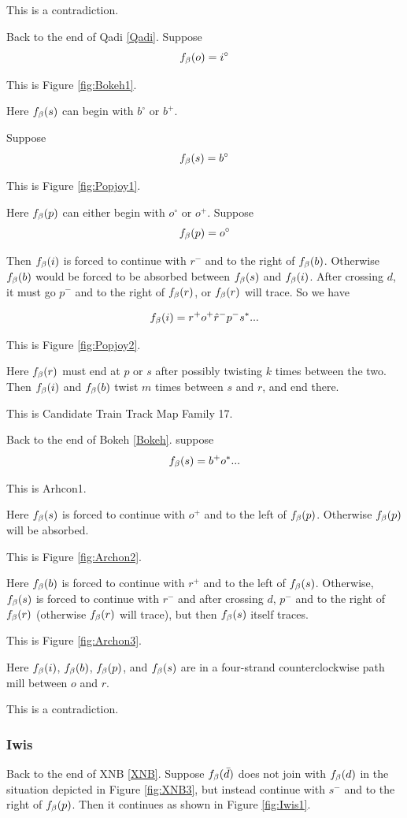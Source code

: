 This is a contradiction.


\label{Bokeh}
Back to the end of Qadi \ref{Qadi}. Suppose 
\[
f_\beta(o) = i^\circ
\]

This is Figure \ref{fig:Bokeh1}.

Here $f_\beta(s)$ can begin with $b^\circ$ or $b^+$.

\label{Popjoy}
Suppose 
\[
f_\beta(s) = b^\circ
\]

This is Figure \ref{fig:Popjoy1}.

Here $f_\beta(p)$ can either begin with $o^\circ$ or $o^+$. Suppose
\[
f_\beta(p) = o^\circ
\]

Then $f_\beta(i)$ is forced to continue with $r^-$ and to the right of $f_\beta(b)$. Otherwise $f_\beta(b)$ would be forced to be absorbed between $f_\beta(s)$ and $f_\beta(i)$. After crossing $d$, it must go $p^-$ and to the right of $f_\beta(r)$, or $f_\beta(r)$ will trace. So we have

\[
f_\beta(i) = r^+ o^+ \hat{r}^- p^- s^*...
\]

This is Figure \ref{fig:Popjoy2}.

Here $f_\beta(r)$ must end at $p$ or $s$ after possibly twisting $k$ times between the two. Then $f_\beta(i)$ and $f_\beta(b)$ twist $m$  times between $s$ and $r$, and end there.


This is Candidate Train Track Map Family 17.

\label{Archon}
Back to the end of Bokeh \ref{Bokeh}. suppose
\[
f_\beta(s) = b^+ o^*...
\]

This is Arhcon1.

Here $f_\beta(s)$ is forced to continue with $o^+$ and to the left of $f_\beta(p)$. Otherwise $f_\beta(p)$ will be absorbed.

This is Figure \ref{fig:Archon2}.

Here $f_\beta(b)$ is forced to continue with $r^+$ and to the left of $f_\beta(s)$. Otherwise, $f_\beta(s)$ is forced to continue with $r^-$ and after crossing $d$, $p^-$ and to the right of $f_\beta(r)$ (otherwise $f_\beta(r)$ will trace), but then $f_\beta(s)$ itself traces.

This is Figure \ref{fig:Archon3}.

Here $f_\beta(i)$, $f_\beta(b)$, $f_\beta(p)$, and $f_\beta(s)$ are in a four-strand counterclockwise path mill between $o$ and $r$.

This is a contradiction.

\subsubsection{Iwis}\label{Iwis}
Back to the end of XNB \ref{XNB}. Suppose $f_\beta(\bar{d})$ does not join with $f_\beta(d)$ in the situation depicted in Figure \ref{fig:XNB3}, but instead continue with $s^-$ and to the right of $f_\beta(p)$. Then it continues as shown in Figure \ref{fig:Iwis1}.

